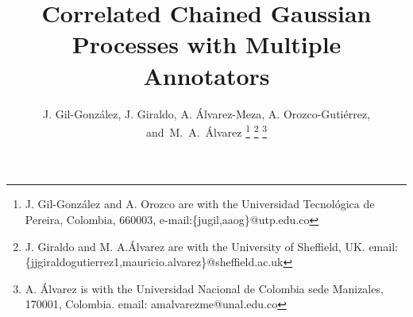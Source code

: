 \documentclass[journal]{IEEEtran}
\begin{document}
%
\title{Correlated Chained Gaussian Processes with Multiple Annotators}
%
%
%

\author{J. Gil-Gonz\'alez,
        J. Giraldo,
        A. \'Alvarez-Meza, A. Orozco-Guti\'errez,  and~M.~A.~\'Alvarez%
\thanks{J. Gil-Gonz\'alez and A. Orozco are with the Universidad Tecnol\'ogica de Pereira, Colombia, 660003, e-mail:\{jugil,aaog\}@utp.edu.co}%
\thanks{J. Giraldo and M. A.\'Alvarez are with the University of Sheffield, UK. email: \{jjgiraldogutierrez1,mauricio.alvarez\}@sheffield.ac.uk}%
\thanks{A. \'Alvarez is with the Universidad Nacional de Colombia sede Manizales, 170001, Colombia. email: amalvarezme@unal.edu.co}}

% 
%
\end{document}
